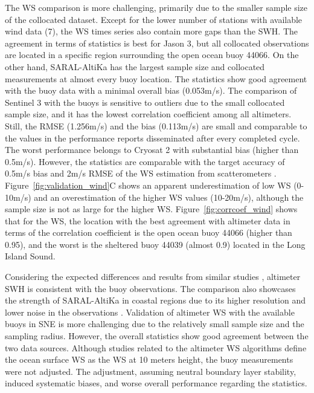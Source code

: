 The WS comparison is more challenging, primarily due to the smaller sample size of the collocated dataset. Except for the lower number of stations with available wind data (7), the WS times series also contain more gaps than the SWH. The agreement in terms of statistics is best for Jason 3, but all collocated observations are located in a specific region surrounding the open ocean buoy 44066. On the other hand, SARAL-AltiKa has the largest sample size and collocated measurements at almost every buoy location. The statistics show good agreement with the buoy data with a minimal overall bias (0.053m/s). The comparison of Sentinel 3 with the buoys is sensitive to outliers due to the small collocated sample size, and it has the lowest correlation coefficient among all altimeters. Still, the RMSE (1.256m/s) and the bias (0.113m/s) are small and comparable to the values in the performance reports disseminated after every completed cycle. The worst performance belongs to Cryosat 2 with substantial bias (higher than 0.5m/s). However, the statistics are comparable with the target accuracy of 0.5m/s bias and 2m/s RMSE of the WS estimation from scatterometers \cite{Saldana2002}. Figure~\ref{fig:validation_wind}C shows an apparent underestimation of low WS (0-10m/s) and an overestimation of the higher WS values (10-20m/s), although the sample size is not as large for the higher WS. Figure~\ref{fig:corrcoef_wind} shows that for the WS, the location with the best agreement with altimeter data in terms of the correlation coefficient is the open ocean buoy 44066 (higher than 0.95), and the worst is the sheltered buoy 44039 (almost 0.9) located in the Long Island Sound.

Considering the expected differences \cite{Monaldo1988} and results from similar studies \cite{Sepulveda2015, Yang2019}, altimeter SWH is consistent with the buoy observations. The comparison also showcases the strength of SARAL-AltiKa in coastal regions due to its higher resolution and lower noise in the observations \cite{Ardhuin2019, Bonnefond2018}. Validation of altimeter WS with the available buoys in SNE is more challenging due to the relatively small sample size and the sampling radius. However, the overall statistics show good agreement between the two data sources. Although studies related to the altimeter WS algorithms \cite{Abdalla2007, Gourrion2002, Lillibridge2014} define the ocean surface WS as the WS at 10 meters height, the buoy measurements were not adjusted. The adjustment, assuming neutral boundary layer stability, induced systematic biases, and worse overall performance regarding the statistics.





